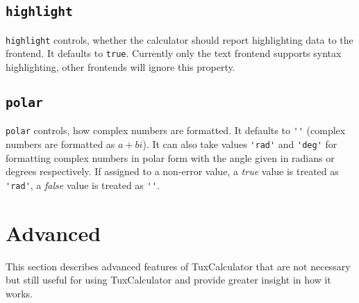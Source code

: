 \documentclass[10pt]{article}
\begin{document}
    \subsection{\texttt{highlight}}\label{subsec:highlight}
    \verb|highlight| controls, whether the calculator should report highlighting data to the frontend.
    It defaults to \verb|true|.
    Currently only the text frontend supports syntax highlighting, other frontends will ignore this property.
    
    \subsection{\texttt{polar}}\label{subsec:polar}
    \verb|polar| controls, how complex numbers are formatted.
    It defaults to \verb|''| (complex numbers are formatted as $ a + bi $).
    It can also take values \verb|'rad'| and \verb|'deg'| for formatting complex numbers in polar form with the angle given in radians or degrees respectively.
    If assigned to a non-error value, a \textsl{true} value is treated as \verb|'rad'|, a \textsl{false} value is treated as \verb|''|.
    
    \section{Advanced}\label{sec:advanced}
    This section describes advanced features of TuxCalculator that are not necessary but still useful for using TuxCalculator and provide greater insight in how it works.
    
\end{document}
